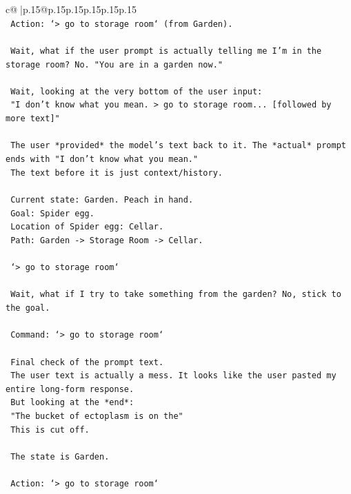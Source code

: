 \documentclass{article}
\begin{document}
{\begin{supertabular}{c@{$\;$}|p{.15\linewidth}@{}p{.15\linewidth}p{.15\linewidth}p{.15\linewidth}p{.15\linewidth}p{.15\linewidth}}
{{{\\ 
\texttt{    Action: `> go to storage room` (from Garden).} \\
\\ 
\texttt{    Wait, what if the user prompt is actually telling me I'm in the storage room? No. "You are in a garden now."} \\
\\ 
\texttt{    Wait, looking at the very bottom of the user input:} \\
\texttt{    "I don't know what you mean. > go to storage room... {[}followed by more text{]}"} \\
\\ 
\texttt{    The user *provided* the model's text back to it. The *actual* prompt ends with "I don't know what you mean."} \\
\texttt{    The text before it is just context/history.} \\
\\ 
\texttt{    Current state: Garden. Peach in hand.} \\
\texttt{    Goal: Spider egg.} \\
\texttt{    Location of Spider egg: Cellar.} \\
\texttt{    Path: Garden {-}> Storage Room {-}> Cellar.} \\
\\ 
\texttt{    `> go to storage room`} \\
\\ 
\texttt{    Wait, what if I try to take something from the garden? No, stick to the goal.} \\
\\ 
\texttt{    Command: `> go to storage room`} \\
\\ 
\texttt{    Final check of the prompt text.} \\
\texttt{    The user text is actually a mess. It looks like the user pasted my entire long{-}form response.} \\
\texttt{    But looking at the *end*:} \\
\texttt{    "The bucket of ectoplasm is on the"} \\
\texttt{    This is cut off.} \\
\\ 
\texttt{    The state is Garden.} \\
\\ 
\texttt{    Action: `> go to storage room`} \\
\\ 
}}}
\end{supertabular}}
\end{document}
